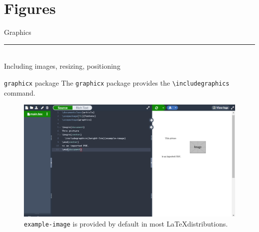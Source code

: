 \documentclass{beamer}
\begin{document}
{  \section{Figures}

  \begin{frame}[plain]
    \vfill
    \centering
    \begin{beamercolorbox}[sep=8pt,center,shadow=true,rounded=true]{Graphics}
      \insertsectionhead\par%
      \color{davisblue}\noindent\rule{10cm}{1pt} \\
      \footnotesize{Including images, resizing, positioning}
    \end{beamercolorbox}
    \vfill
  \end{frame}

  \begin{frame}{\texttt{graphicx} package}
    The \texttt{graphicx} package provides the \texttt{\textbackslash includegraphics} command.
    \begin{figure}
      \includegraphics[width=0.9\linewidth]{day01-overleaf-10A-graphic.png}
      \caption{\texttt{example-image} is provided by default in most \LaTeX distributions.}
      \label{fig:day01-overleaf-10A}
    \end{figure}
  \end{frame}

}
\end{document}
